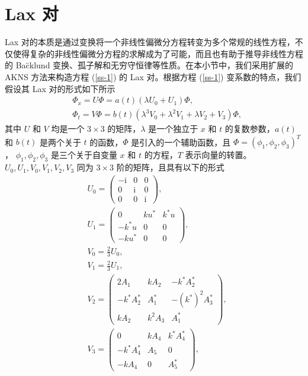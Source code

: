 \section{Lax 对}
Lax 对的本质是通过变换将一个非线性偏微分方程转变为多个常规的线性方程，不仅使得复杂的非线性偏微分方程的求解成为了可能，而且也有助于推导非线性方程的 Ba\"cklund 变换、孤子解和无穷守恒律等性质。在本小节中，我们采用扩展的 AKNS 方法来构造方程 (\ref{ss-1}) 的 Lax 对。根据方程 (\ref{ss-1}) 变系数的特点，我们假设其 Lax 对的形式如下所示
\begin{align}
  & \Phi_{x} = U\Phi = a(t)(\lambda U_{0} + U_{1})\Phi, \label{ss-2}\\
  & \Phi_{t} = V\Phi = b(t)(\lambda^{3}V_{0} + \lambda^{2}V_{1} + \lambda V_{2} + V_{3})\Phi,  \label{ss-3}
\end{align}
其中 $U$ 和 $V$ 均是一个 $3 \times 3$ 的矩阵，$\lambda$ 是一个独立于 $x$ 和 $t$ 的复数参数，$a(t)$ 和 $b(t)$ 是两个关于 $t$ 的函数，$\Phi$ 是引入的一个辅助函数，且 $\Phi = (\phi_1, \phi_2, \phi_3)^T$， $\phi_1, \phi_2, \phi_3$ 是三个关于自变量 $x$ 和 $t$ 的方程，$T$ 表示向量的转置。$U_{0}, U_{1}, V_{0}, V_{1}, V_{2}, V_{3}$ 同为 $3 \times 3$ 阶的矩阵，且具有以下的形式
\begin{align}
  & U_{0} = \begin{pmatrix}
             -\mathrm{i} & 0 & 0 \\
              0 & \mathrm{i} & 0 \\
              0 & 0 & \mathrm{i}
            \end{pmatrix}, \label{ss-lax1} \\
  & U_{1} = \begin{pmatrix}
              0 & ku^{*} & k^{*}u \\
              -k^{*}u & 0 & 0 \\
              -ku^{*} & 0 & 0
            \end{pmatrix}, \\
  & V_{0} = \frac{2}{3}U_{0}, \\
  & V_{1} = \frac{2}{3}U_{1}, \\
  & V_{2} = \begin{pmatrix}
              2A_{1} & kA_{2} & -k^{*}A_{2}^{*} \\
              -k^{*}A_{2}^{*} & A_{1}^{*} & -(k^{*})^{2}A_{3}^{*} \\
              kA_{2} & k^{2}A_{3} & A_{1}^{*}
            \end{pmatrix}, \\
  & V_{3} = \begin{pmatrix}
              0 & kA_{4} & k^{*}A_{4}^{*} \\
              -k^{*}A_{4}^{*} & A_{5} & 0 \\
              -kA_{4} & 0 & A_{5}^{*}
            \end{pmatrix}, \label{ss-lax2}
\end{align}
